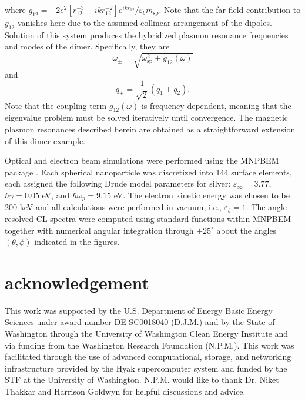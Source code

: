 \documentclass [11pt, proquest] {uwthesis}[2016/11/22]
\begin{document}
where $g_{12}=-2e^2[r_{12}^{-3} - ikr_{12}^{-2}]e^{ikr_{12}}/\varepsilon_bm_{\textrm{sp}}.$ Note that the far-field contribution to $g_{12}$ vanishes here due to the assumed collinear arrangement of the dipoles. Solution of this system produces the hybridized plasmon resonance frequencies and modes of the dimer. Specifically, they are
\begin{equation}
\omega_{\pm} = \sqrt{\omega_{\textrm{sp}}^2 \pm g_{12}(\omega)}
\label{eigenvalues}
\end{equation}
and
\begin{equation}
q_{\pm} = \frac{1}{\sqrt{2}}\left(q_1 \pm q_2\right).
\label{eigenvectors}
\end{equation}
Note that the coupling term $g_{12}(\omega)$ is frequency dependent, meaning that the eigenvalue problem must be solved iteratively until convergence. The magnetic plasmon resonances described herein are obtained as a straightforward extension of this dimer example.




 Optical and electron beam simulations were performed using the MNPBEM package \cite{Hohenester2012,Hohenester2014}. Each spherical nanoparticle was discretized into 144 surface elements, each assigned the following Drude model parameters for silver: $\varepsilon_{\infty} = 3.77$, $\hbar\gamma = 0.05$ eV, and $\hbar\omega_{p} = 9.15$ eV. The electron kinetic energy was chosen to be 200 keV and all calculations were performed in vacuum, i.e., $\varepsilon_{b}=1.$ The angle-resolved CL spectra were computed using standard functions within MNPBEM together with numerical angular integration through $\pm25^\circ$ about the angles $(\theta,\phi)$ indicated in the figures.


\section{acknowledgement}
This work was supported by the U.S. Department of Energy Basic Energy Sciences under award number DE-SC0018040 (D.J.M.) and by the State of Washington through the University of Washington Clean Energy Institute and via funding from the Washington Research Foundation (N.P.M.). This work was facilitated through the use of advanced computational, storage, and networking infrastructure provided by the Hyak supercomputer system and funded by the STF at the University of Washington. N.P.M. would like to thank Dr. Niket Thakkar and Harrison Goldwyn for helpful discussions and advice.
\end{document}
